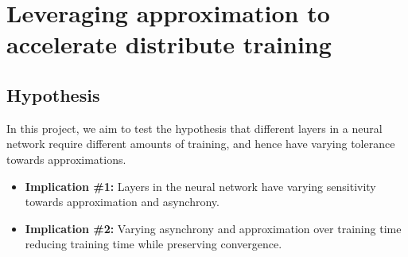\section{Leveraging approximation to accelerate distribute training}
\subsection{Hypothesis}
In this project, we aim to test the hypothesis that different layers in a neural network require different amounts of training, and hence have varying tolerance towards approximations.  
\begin{itemize}
\item \textbf{Implication \#1:} Layers in the neural network have varying sensitivity towards approximation and asynchrony.
\item \textbf{Implication \#2:} Varying asynchrony and approximation over training time reducing training time while preserving convergence.
\end{itemize}
